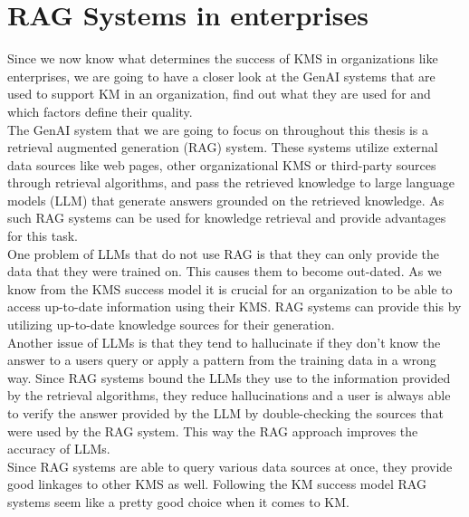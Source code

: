 \documentclass[
	english,
	ruledheaders=section,%
	class=report,%
	thesis={type=bachelor},%
	accentcolor=1b,%
	custommargins=true,%
	marginpar=false,%
	parskip=half-,%
	fontsize=11pt,%
	DIV=14,
]{tudapub}
\begin{document}
\section{RAG Systems in enterprises}
Since we now know what determines the success of KMS in organizations like enterprises, we are going to have a closer look at the GenAI systems that are used to support KM in an organization, find out what they are used for and which factors define their quality.\\
The GenAI system that we are going to focus on throughout this thesis is a retrieval augmented generation (RAG) system. These systems utilize external data sources like web pages, other organizational KMS or third-party sources through retrieval algorithms, and pass the retrieved knowledge to large language models (LLM) that generate answers grounded on the retrieved knowledge. As such RAG systems can be used for knowledge retrieval and provide advantages for this task.\\
One problem of LLMs that do not use RAG is that they can only provide the data that they were trained on. This causes them to become out-dated. As we know from the KMS success model it is crucial for an organization to be able to access up-to-date information using their KMS. RAG systems can provide this by utilizing up-to-date knowledge sources for their generation.\\
Another issue of LLMs is that they tend to hallucinate if they don't know the answer to a users query or apply a pattern from the training data in a wrong way. Since RAG systems bound the LLMs they use to the information provided by the retrieval algorithms, they reduce hallucinations and a user is always able to verify the answer provided by the LLM by double-checking the sources that were used by the RAG system. This way the RAG approach improves the accuracy of LLMs.\\
Since RAG systems are able to query various data sources at once, they provide good linkages to other KMS as well. Following the KM success model RAG systems seem like a pretty good choice when it comes to KM.\\
\end{document}
